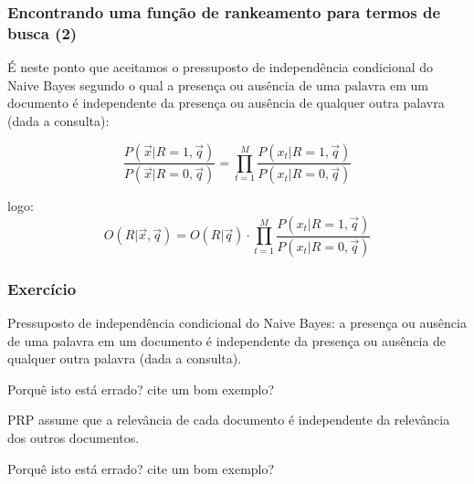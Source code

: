 \documentclass[compress]{beamer}
\def\myblue#1{\textcolor{texblue}{#1}}
\begin{document}
\begin{frame}[<+->]
\frametitle{Encontrando uma função de rankeamento para termos de busca (2)}
\pause[2]

É neste ponto que aceitamos o pressuposto de \myblue{independência condicional do Naive Bayes} segundo o qual a presença ou ausência de uma palavra em um documento é independente da presença ou ausência de qualquer outra palavra (dada a consulta):

\begin{equation}
\nonumber
\frac{P(\vec{x}|R=1,\vec{q})}{P(\vec{x}|R=0,\vec{q})} = \prod_{t=1}^M
\frac{P(x_t|R=1,\vec{q})}{P(x_t|R=0,\vec{q})}
\end{equation}

logo:
\begin{equation}
\nonumber
O(R|\vec{x},\vec{q}) = O(R|\vec{q}) \cdot \prod_{t=1}^M
\frac{P(x_t|R=1,\vec{q})}{P(x_t|R=0,\vec{q})}
\end{equation}
\end{frame}

\begin{frame}[<+->]
\frametitle{Exercício}
\pause[2]

Pressuposto de independência condicional do Naive Bayes:  a presença ou ausência de uma palavra em um documento é independente da presença ou ausência de qualquer outra palavra (dada a consulta).

\pause

\myblue{Porquê isto está errado? cite um bom exemplo? }

\pause

PRP assume que a relevância de cada documento é independente da relevância dos outros documentos.

\pause

\myblue{Porquê isto está errado? cite um bom exemplo?}



\end{frame}
\end{document}

